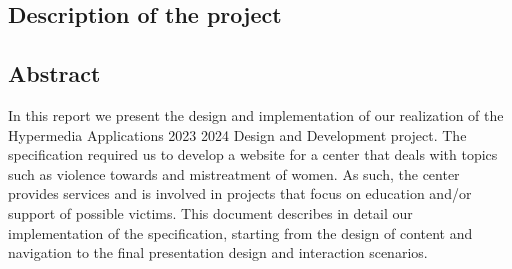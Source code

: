 \subsection{Description of the project}

\subsection{Abstract}
In this report we present the design and implementation of our realization of the Hypermedia Applications 2023 2024 Design and Development project. 
The specification required us to develop a website for a center that deals with topics such as violence towards and mistreatment of women. As such, 
the center provides services and is involved in projects that focus on education and/or support of possible victims. This document describes in detail 
our implementation of the specification, starting from the design of content and navigation to the final presentation design and interaction scenarios.
